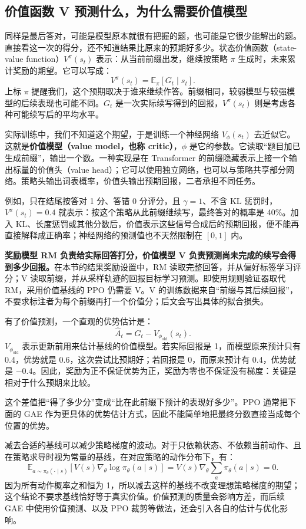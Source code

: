 \subsection{价值函数 V 预测什么，为什么需要价值模型}

同样是最后答对，可能是模型原本就很有把握的题，也可能是它很少能解出的题。直接看这一次的得分，还不知道结果比原来的预期好多少。状态价值函数（state-value function）$V^\pi(s_t)$ 表示：从当前前缀出发，继续按策略 $\pi$ 生成时，未来累计奖励的期望。它可以写成：
\[
    V^\pi(s_t)=\mathbb E_\pi[G_t\mid s_t].
\]
上标 $\pi$ 提醒我们，这个预期取决于谁来继续作答。前缀相同，较弱模型与较强模型的后续表现也可能不同。$G_t$ 是一次实际续写得到的回报，$V^\pi(s_t)$ 则是考虑各种可能续写后的平均水平。

实际训练中，我们不知道这个期望，于是训练一个神经网络 $V_\phi(s_t)$ 去近似它。这就是\textbf{价值模型（value model，也称 critic）}，$\phi$ 是它的参数。它读取``题目加已生成前缀''，输出一个数。一种实现是在 Transformer 的前缀隐藏表示上接一个输出标量的价值头（value head）；它可以使用独立网络，也可以与策略共享部分网络。策略头输出词表概率，价值头输出预期回报，二者承担不同任务。

例如，只在结尾按答对 1 分、答错 0 分评分，且 $\gamma=1$、不含 KL 惩罚时，$V^\pi(s_t)=0.4$ 就表示：按这个策略从此前缀继续写，最终答对的概率是 40\%。加入 KL、长度惩罚或其他分数后，价值表示这些信号合成后的预期回报，便不能再直接解释成正确率；神经网络的预测值也不天然限制在 $[0,1]$ 内。

\textbf{奖励模型 RM 负责给实际回答打分，价值模型 V 负责预测尚未完成的续写会得到多少回报。}在本节的结果奖励设置中，RM 读取完整回答，并从偏好标签学习评分；V 读取前缀，并从采样轨迹的回报目标学习预测。即使用规则验证器取代 RM，采用价值基线的 PPO 仍需要 V。V 的训练数据来自``前缀与其后续回报''，不要求标注者为每个前缀再打一个价值分；后文会写出具体的拟合损失。

有了价值预测，一个直观的优势估计是：
\[
    \widehat A_t=G_t-V_{\phi_{\mathrm{old}}}(s_t).
\]
$V_{\phi_{\mathrm{old}}}$ 表示更新前用来估计基线的价值模型。若实际回报是 1，而模型原来预计只有 0.4，优势就是 $0.6$，这次尝试比预期好；若回报是 0，而原来预计有 0.4，优势就是 $-0.4$。因此，奖励为正不保证优势为正，奖励为零也不保证没有梯度：关键是相对于什么预期来比较。

这个差值把``得了多少分''变成``比在此前缀下预计的表现好多少''。PPO 通常把下面的 GAE 作为更具体的优势估计方式，因此不能简单地把最终分数直接当成每个位置的优势。

减去合适的基线可以减少策略梯度的波动。对于只依赖状态、不依赖当前动作、且在策略求导时视为常量的基线，在对应策略的动作分布下，有：
\[
    \mathbb E_{a\sim\pi_\theta(\cdot\mid s)}
    \left[V(s)\nabla_\theta\log\pi_\theta(a\mid s)\right]
    =V(s)\nabla_\theta\sum_a\pi_\theta(a\mid s)=0.
\]
因为所有动作概率之和恒为 1，所以减去这样的基线不改变理想策略梯度的期望；这个结论不要求基线恰好等于真实价值。价值预测的质量会影响方差，而后续 GAE 中使用价值预测、以及 PPO 裁剪等做法，还会引入各自的估计与优化影响。

